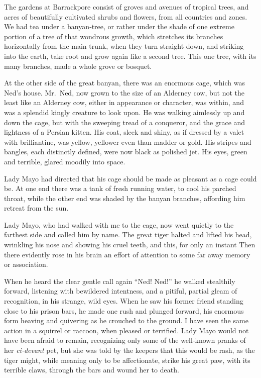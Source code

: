 \documentclass[12pt]{book}
\begin{document}
The gardens at Barrackpore consist of groves and avenues of tropical trees, and
acres of beautifully cultivated shrubs and flowers, from all countries and zones.
We had tea under a banyan‐tree, or rather under the shade of one extreme portion
of a tree of that wondrous growth, which stretches its branches horizontally from
the main trunk, when they turn straight down, and striking into the earth, take
root and grow again like a second tree. This one tree, with its many branches,
made a whole grove or bosquet.

At the other side of the great banyan, there was an enormous cage, which
was Ned’s house. Mr.~Ned, now grown to the size of an Alderney cow, but not
the least like an Alderney cow, either in appearance or character, was within, and
was a splendid kingly creature to look upon. He was walking aimlessly up and
down the cage, but with the sweeping tread of a conqueror, and the grace and
lightness of a Persian kitten. His coat, sleek and shiny, as if dressed by a valet
with brilliantine, was yellow, yellower even than madder or gold. His stripes and
bangles, each distinctly defined, were now black as polished jet. His eyes, green
and terrible, glared moodily into space.

Lady Mayo had directed that his cage should be made as pleasant as a cage
could be. At one end there was a tank of fresh running water, to cool his parched
throat, while the other end was shaded by the banyan branches, affording him
retreat from the sun.

Lady Mayo, who had walked with me to the cage, now went quietly to the
farthest side and called him by name. The great tiger halted and lifted his head,
wrinkling his nose and showing his cruel teeth, and this, for only an instant Then
there evidently rose in his brain an effort of attention to some far away memory
or association.

When he heard the clear gentle call again “Ned! Ned!” he walked stealthily
forward, listening with bewildered intentness, and a pitiful, partial gleam of
recognition, in his strange, wild eyes. When he saw his former friend standing
close to his prison bars, he made one rush and plunged forward, his enormous
form heaving and quivering as he crouched to the ground. I have seen the same
action in a squirrel or raccoon, when pleased or terrified. Lady Mayo would not
have been afraid to remain, recognizing only some of the well‐known pranks of
her {\it ci‐devant} pet, but she was told by the keepers that this would be rash, as the
tiger might, while meaning only to be affectionate, strike his great paw, with its
terrible claws, through the bars and wound her to death.
\end{document}
